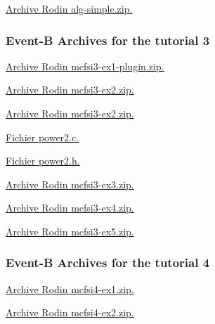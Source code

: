 \documentclass[ 12pt]{article}
\begin{document}
\href{http://mery54.github.io/teaching/mosos/models/alg-simple.zip}{Archive 
  Rodin  alg-simple.zip.}





 \subsubsection{Event-B Archives for   the tutorial 3}
\label{sec:event-b-archives}





\href{http://mery54.github.io/teaching/mosos/models/mcfsi3-ex1-plugin.zip}{Archive 
  Rodin  mcfsi3-ex1-plugin.zip.}

\href{http://mery54.github.io/teaching/mosos/models/mcfsi3-ex2.zip}{Archive 
  Rodin  mcfsi3-ex2.zip.}

\href{http://mery54.github.io/teaching/mosos/models/mcfsi3-ex2-plugin.zip}{Archive 
  Rodin  mcfsi3-ex2.zip.}



\href{http://mery54.github.io/teaching/mosos/codes/power2.c}{Fichier 
  power2.c.}

\href{http://mery54.github.io/teaching/mosos/codes/power2.h}{Fichier 
  power2.h.}


\href{http://mery54.github.io/teaching/mosos/models/mcfsi3-ex3.zip}{Archive 
  Rodin  mcfsi3-ex3.zip.}



\href{http://mery54.github.io/teaching/mosos/models/mcfsi3-ex4.zip}{Archive 
  Rodin  mcfsi3-ex4.zip.}



\href{http://mery54.github.io/teaching/mosos/models/mcfsi3-ex5.zip}{Archive 
  Rodin  mcfsi3-ex5.zip.}



 \subsubsection{Event-B Archives for   the tutorial 4}
\label{sec:event-b-archives}





\href{http://mery54.github.io/teaching/mosos/models/mcfsi4-ex1.zip}{Archive 
  Rodin  mcfsi4-ex1.zip.}


\href{http://mery54.github.io/teaching/mosos/models/mcfsi4-ex2.zip}{Archive 
  Rodin  mcfsi4-ex2.zip.}
\end{document}
